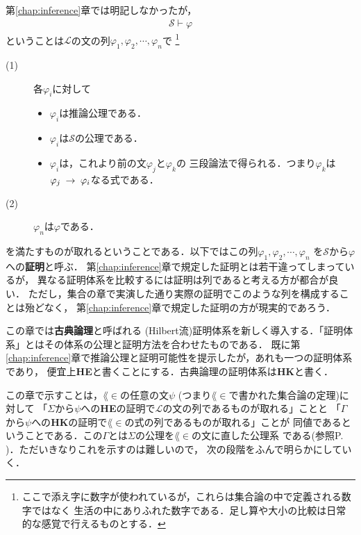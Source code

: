 	第\ref{chap:inference}章では明記しなかったが，
	\begin{align}
		\mathscr{S} \vdash \varphi
	\end{align}
	ということは$\mathcal{L}$の文の列$\varphi_{1},\varphi_{2},\cdots,\varphi_{n}$で
	\footnote{
		ここで添え字に数字が使われているが，これらは集合論の中で定義される数字ではなく
		生活の中にありふれた数字である．足し算や大小の比較は日常的な感覚で行えるものとする．
	}
	\begin{description}
		\item[(1)] 各$\varphi_{i}$に対して
			\begin{itemize}
				\item $\varphi_{i}$は推論公理である．
				\item $\varphi_{i}$は$\mathscr{S}$の公理である．
				\item $\varphi_{i}$は，これより前の文$\varphi_{j}$と$\varphi_{k}$の
					三段論法で得られる．つまり$\varphi_{k}$は
					$\varphi_{j} \hspace{0.25em}\rightarrow\hspace{0.25em} \varphi_{i}$なる式である．
			\end{itemize}
		
		\item[(2)] $\varphi_{n}$は$\varphi$である．
	\end{description}
	を満たすものが取れるということである．以下ではこの列$\varphi_{1},\varphi_{2},\cdots,\varphi_{n}$
	を$\mathscr{S}$から$\varphi$への{\bf 証明}と呼ぶ．
	第\ref{chap:inference}章で規定した証明とは若干違ってしまっているが，
	異なる証明体系を比較するには証明は列であると考える方が都合が良い．
	ただし，集合の章で実演した通り実際の証明でこのような列を構成することは殆どなく，
	第\ref{chap:inference}章で規定した証明の方が現実的であろう．
	
	この章では{\bf 古典論理}と呼ばれる
	(Hilbert流)証明体系を新しく導入する．「証明体系」とはその体系の公理と証明方法を合わせたものである．
	既に第\ref{chap:inference}章で推論公理と証明可能性を提示したが，あれも一つの証明体系であり，
	便宜上{\bf HE}と書くことにする．古典論理の証明体系は{\bf HK}と書く．
	
	この章で示すことは，$\lang{\in}$の任意の文$\psi$
	(つまり$\lang{\in}$で書かれた集合論の定理)に対して
	「$\Sigma$から$\psi$への{\bf HE}の証明で$\mathcal{L}$の文の列であるものが取れる」ことと
	「$\Gamma$から$\psi$への{\bf HK}の証明で$\lang{\in}$の式の列であるものが取れる」ことが
	同値であるということである．この$\Gamma$とは$\Sigma$の公理を$\lang{\in}$の文に直した公理系
	である(参照P. \pageref{axioms_of_Gamma})．ただいきなりこれを示すのは難しいので，
	次の段階をふんで明らかにしていく．
	
